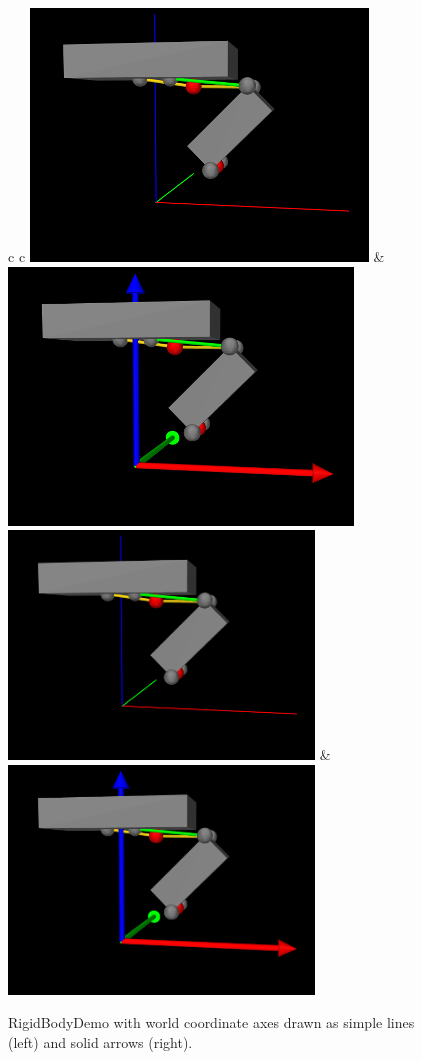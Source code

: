 \documentclass{article}
\begin{document}
\begin{figure}[h]
\begin{center}
\begin{tabular}{c c}
\iflatexml
\includegraphics[]{images/viewerLineAxes} &
\includegraphics[]{images/viewerArrowAxes}
\else
\includegraphics[width=3.2in]{images/viewerLineAxes} &
\includegraphics[width=3.2in]{images/viewerArrowAxes}
\fi
\end{tabular}
\end{center}
\caption{RigidBodyDemo with world coordinate axes drawn
as simple lines (left) and solid arrows (right).}%
\label{worldCoordAxes:fig}
\end{figure}
\end{document}
